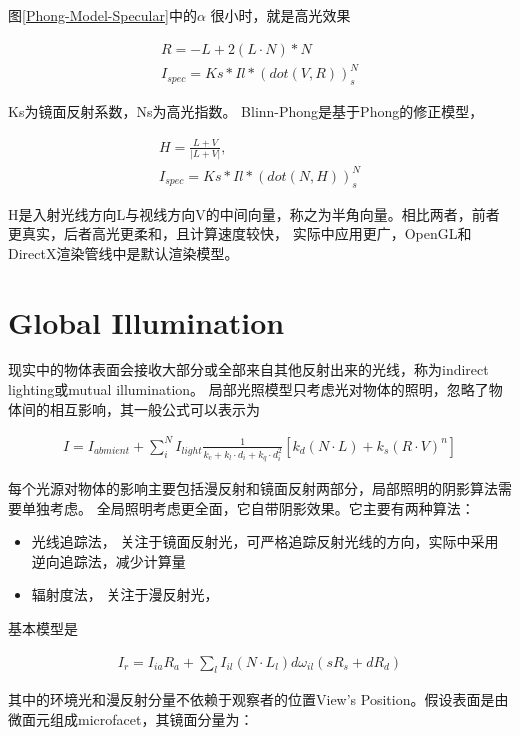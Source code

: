 图\ref{Phong-Model-Specular}中的$\alpha$ 很小时，就是高光效果

\begin{align*}
    R = -L + 2(L \cdot N) * N \\
    I_{spec}=Ks * Il * (dot(V, R))^N_{s}
\end{align*}

Ks为镜面反射系数，Ns为高光指数。
Blinn-Phong是基于Phong的修正模型，

\begin{align*}
    H = \frac{L + V}{|L + V|}, \\
    I_{spec} = Ks * Il * (dot(N, H))^N_{s}
\end{align*}

H是入射光线方向L与视线方向V的中间向量，称之为半角向量。相比两者，前者更真实，后者高光更柔和，且计算速度较快，
实际中应用更广，OpenGL和DirectX渲染管线中是默认渲染模型。

\section{Global Illumination}
现实中的物体表面会接收大部分或全部来自其他反射出来的光线，称为indirect lighting或mutual illumination。
局部光照模型只考虑光对物体的照明，忽略了物体间的相互影响，其一般公式可以表示为

\begin{align*}
    I = I_{abmient} + \sum_{i}^{N}I_{light}\frac{1}{k_{c}+k_{l} \cdot d_{i} + k_{q} \cdot d_{i}^2}
    \left[ k_{d}(N \cdot L) + k_{s}(R \cdot V)^n \right]
\end{align*}

每个光源对物体的影响主要包括漫反射和镜面反射两部分，局部照明的阴影算法需要单独考虑。
\newline
全局照明考虑更全面，它自带阴影效果。它主要有两种算法：
\begin{itemize}
    \item {光线追踪法， 关注于镜面反射光，可严格追踪反射光线的方向，实际中采用逆向追踪法，减少计算量}
    \item {辐射度法， 关注于漫反射光，}
\end{itemize}
基本模型是 
\newline

\begin{align*}
    I_r = I_{ia}R_{a} + \sum_{l}I_{il}(N \cdot L_{l})d \omega_{il}(sR_{s} + dR_{d})
\end{align*}

其中的环境光和漫反射分量不依赖于观察者的位置View's Position。假设表面是由微面元组成microfacet，其镜面分量为：
\newline

